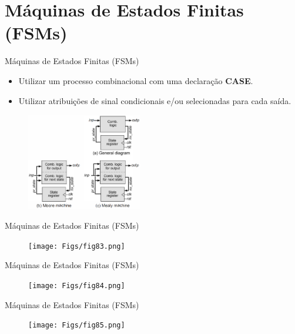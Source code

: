 \documentclass[aspectratio=169]{beamer}
\begin{document}
\section{Máquinas de Estados Finitas (FSMs)}
\begin{frame}{Máquinas de Estados Finitas (FSMs)}
	\justifying
	
	\begin{block}{}
	\begin{itemize}
		\item Utilizar um processo combinacional com uma declaração \textbf{CASE}.
		\item Utilizar atribuições de sinal condicionais e/ou selecionadas para cada saída.
	\end{itemize}	
	\end{block}	
	
	\begin{figure}[h]
		\centering
		\includegraphics[width=0.45\textwidth]{Figs/fig82.png}
	\end{figure}
	
\end{frame}

\begin{frame}{Máquinas de Estados Finitas (FSMs)}
	\justifying
	
	
	\begin{figure}[h]
		\centering
		\texttt{[image: Figs/fig83.png]}
	\end{figure}
	
\end{frame}
\begin{frame}{Máquinas de Estados Finitas (FSMs)}
	\justifying
	
	
	\begin{figure}[h]
		\centering
		\texttt{[image: Figs/fig84.png]}
	\end{figure}
	
\end{frame}
\begin{frame}{Máquinas de Estados Finitas (FSMs)}
	\justifying
	
	
	\begin{figure}[h]
		\centering
		\texttt{[image: Figs/fig85.png]}
	\end{figure}
	
\end{frame}
\end{document}
